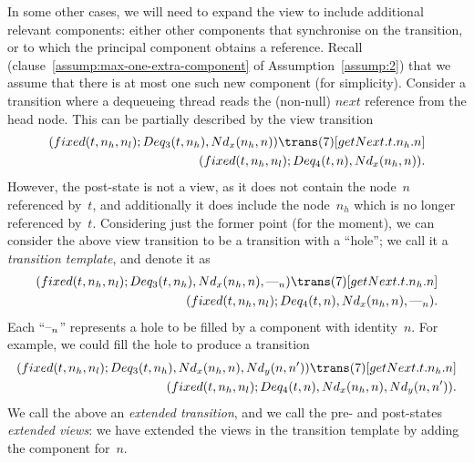 In some other cases, we will need to expand the view to include additional
relevant components: either other components that synchronise on the
transition, or to which the principal component obtains a reference.  Recall
(clause~\ref{assump:max-one-extra-component} of Assumption~\ref{assump:2})
that we assume that there is at most one such new component (for simplicity).
Consider a transition where a dequeueing thread reads the (non-null) $next$
reference from the head node.  This can be partially described by the view
transition
\[
\begin{align}
(fixed(t, n_h, n_l); Deq_3(t, n_h), \Node_x(n_h, n))
  \trans(7)[getNext.t.n_h.n] \\
\qquad (fixed(t, n_h, n_l); Deq_4(t, n), \Node_x(n_h, n)).
\end{align}
\]
However, the post-state is not a view, as it does not contain the node~$n$
referenced by~$t$, and additionally it does include the node~$n_h$ which is no
longer referenced by~$t$.  Considering just the former point (for the moment),
we can consider the above view transition to be a transition with a ``hole'';
we call it a \emph{transition template}, and denote it as
\[
\begin{align}
(fixed(t, n_h, n_l); Deq_3(t, n_h), \Node_x(n_h, n), \bighole{n})
  \trans(7)[getNext.t.n_h.n] \\
\qquad (fixed(t, n_h, n_l); Deq_4(t, n), \Node_x(n_h, n), \bighole{n}).
\end{align}
\]
Each ``$\mbox{--}_{n}$'' represents a hole to be filled by a component with
identity~$n$.  For example, we could fill the hole to produce a transition
\begin{equation}
\begin{align}
(fixed(t, n_h, n_l); Deq_3(t, n_h), \Node_x(n_h, n), \Node_y(n, n'))
  \trans(7)[getNext.t.n_h.n] \\
\qquad (fixed(t, n_h, n_l);   Deq_4(t, n), \Node_x(n_h, n), \Node_y(n, n')).
\label{trans:getNext}
\end{align}
\end{equation}
%
We call the above an \emph{extended transition}, and we call the pre- and
post-states \emph{extended views}: we have extended the views in the
transition template by adding the component for~$n$.

